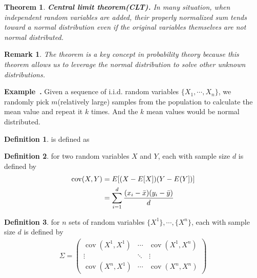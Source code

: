 \documentclass[a4paper]{article}
\theoremstyle{definition}
\newtheorem{definition}{Definition}
\theoremstyle{plain}
\newtheorem{theorem}{Theorem}
\newtheorem{remark}{Remark}
\newenvironment{example}[1][]{\refstepcounter{example}\par\medskip
   \noindent \textbf{Example~\theexample. #1} \rmfamily}{\medskip}
\newcounter{example}{Example}
\begin{document}
\begin{theorem}
\textbf{Central limit theorem(CLT).} In many situation, when independent random variables are added, their properly normalized sum tends toward a normal distribution even if the original variables themselves are not normal distributed.
\end{theorem}

\begin{remark}
The theorem is a key concept in probability theory because this theorem allows us to leverage the normal distribution to solve other unknown distributions.
\end{remark}

\begin{example}
Given a sequence of i.i.d. random variables $\{X_1,\cdots,X_n\}$, we randomly pick $m$(relatively large) samples from the population to calculate the mean value and repeat it $k$ times. And the $k$ mean values would be normal distributed.
\end{example}

\begin{definition}
 is defined as 

\end{definition}

\begin{definition}
 for two random variables $X$ and $Y$, each with sample size $d$ is defined by
\begin{align*}
    \operatorname{cov}(X,Y)&=E[(X-E[X])(Y-E(Y])]\\
    &=\sum^d_{i=1}\frac{(x_i-\Bar{x})(y_i-\Bar{y})}{d}
\end{align*}
\end{definition}

\begin{definition}
 for $n$ sets of random variables $\{X^1\},\cdots,\{X^n\}$, each with sample size $d$ is defined by
\begin{align*}
    \Sigma=
    \begin{pmatrix}
        \operatorname{cov}(X^1,X^1) & \cdots & \operatorname{cov}(X^1,X^n)\\
        \vdots &  \ddots &  \vdots \\
        \operatorname{cov}(X^n,X^1) & \cdots & \operatorname{cov}(X^n,X^n)
    \end{pmatrix}
\end{align*}
\end{definition}
\end{document}
